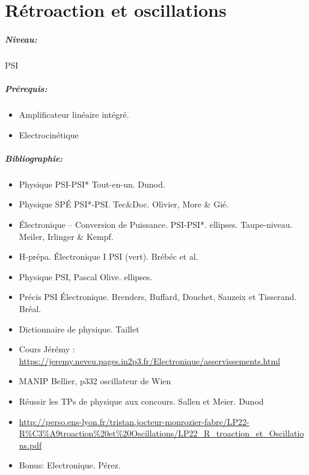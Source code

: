 \documentclass[11pt]{report}
\numberwithin{figure}{section}
\numberwithin{equation}{section}
\numberwithin{table}{section}
\newcommand{\1}{\boldsymbol{1}}
\begin{document}
\newpage



\chapter{Rétroaction et oscillations}

\paragraph*{Niveau:} PSI

\paragraph*{Prérequis:} 
\begin{itemize}
\item Amplificateur linéaire intégré.
\item Electrocinétique
\end{itemize}

\paragraph*{Bibliographie:}
\begin{itemize}
\item Physique PSI-PSI* Tout-en-un. Dunod.
\item Physique SP\'E PSI*-PSI. Tec\&Doc. Olivier, More \& Gié.
\item Électronique -- Conversion de Puissance. PSI-PSI*. ellipses. Taupe-niveau. Meiler, Irlinger \& Kempf.
\item H-prépa. Électronique I PSI (vert). Brébéc et al.
\item Physique PSI, Pascal Olive. ellipses.
\item Précis PSI \'Electronique. Brenders, Buffard, Douchet, Sauzeix et Tisserand. Bréal.
\item Dictionnaire de physique. Taillet
\item Cours Jérémy : \url{https://jeremy.neveu.pages.in2p3.fr/Electronique/asservissements.html}
\item MANIP Bellier, p332 oscillateur de Wien
\item Réussir les TPs de physique aux concours. Sallen et Meier. Dunod
\item \url{http://perso.ens-lyon.fr/tristan.jocteur-monrozier-fabre/LP22-R%C3%A9troaction%20et%20Oscillations/LP22_R_troaction_et_Oscillations.pdf}
\item Bonus: Electronique. Pérez.
\end{itemize}
\end{document}
